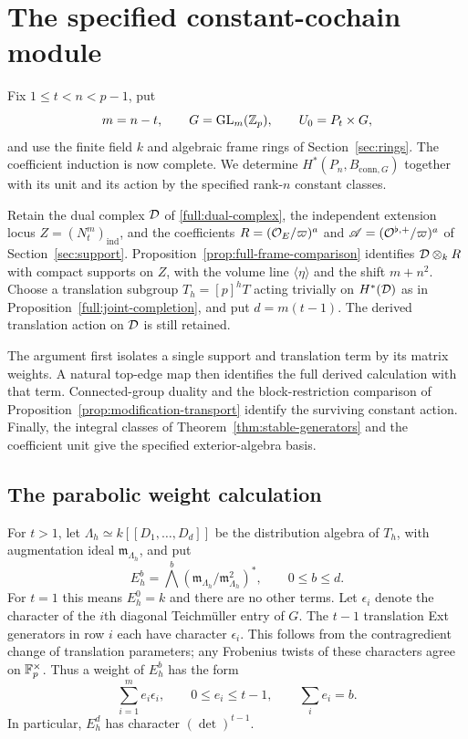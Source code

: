 \section{The specified constant-cochain module}
\label{full:module-section}

Fix $1\leq t<n<p-1$, put
\[
 m=n-t,\qquad G=\operatorname{GL}_m(\mathbb Z_p),\qquad U_0=P_t\times G,
\]
and use the finite field $k$ and algebraic frame rings of
Section~\ref{sec:rings}.  The coefficient induction is now complete.
We determine $H^*(P_n,B_{\mathrm{conn},G})$ together with its unit
and its action by the specified rank-$n$ constant classes.

Retain the dual complex $\mathcal D$ of \eqref{full:dual-complex}, the
independent extension locus $Z=(N_t^m)_{\mathrm{ind}}$, and the
coefficients $R=(\mathcal O_E/\varpi)^a$ and
$\mathscr A=(\mathcal O^{\flat,+}/\varpi)^a$ of
Section~\ref{sec:support}.  Proposition~\ref{prop:full-frame-comparison}
identifies $\mathcal D\otimes_kR$ with compact supports on $Z$, with the
volume line $\langle\eta\rangle$ and the shift $m+n^2$.
Choose a translation subgroup $T_h=[p]^hT$ acting trivially on
$H^*(\mathcal D)$ as in Proposition~\ref{full:joint-completion}, and put
$d=m(t-1)$.  The derived translation action on $\mathcal D$ is still retained.

The argument first isolates a single support and translation term by
its matrix weights.  A natural top-edge map then identifies the full
derived calculation with that term.  Connected-group duality and the
block-restriction comparison of
Proposition~\ref{prop:modification-transport} identify the surviving
constant action.  Finally, the integral classes of
Theorem~\ref{thm:stable-generators} and the coefficient unit give the
specified exterior-algebra basis.

\subsection{The parabolic weight calculation}

For $t>1$, let $\Lambda_h\simeq k[[D_1,\ldots,D_d]]$ be the
distribution algebra of $T_h$, with augmentation ideal
$\mathfrak m_{\Lambda_h}$, and put
\[
 E_h^b=\bigwedge^b
       (\mathfrak m_{\Lambda_h}/\mathfrak m_{\Lambda_h}^2)^*,
       \qquad 0\leq b\leq d.
\]
For $t=1$ this means $E_h^0=k$ and there are no other terms.
Let $\epsilon_i$ denote the character of the $i$th diagonal
Teichm\"uller entry of $G$.  The $t-1$ translation Ext generators in
row $i$ each have character $\epsilon_i$.  This follows from the
contragredient change of translation parameters; any Frobenius twists
of these characters agree on $\mathbb F_p^\times$.
Thus a weight of $E_h^b$ has the form
\begin{equation}
\label{full:exterior-weights}
 \sum_{i=1}^m e_i\epsilon_i,\qquad
 0\leq e_i\leq t-1,\qquad \sum_i e_i=b.
\end{equation}
In particular, $E_h^d$ has character $(\det)^{t-1}$.

